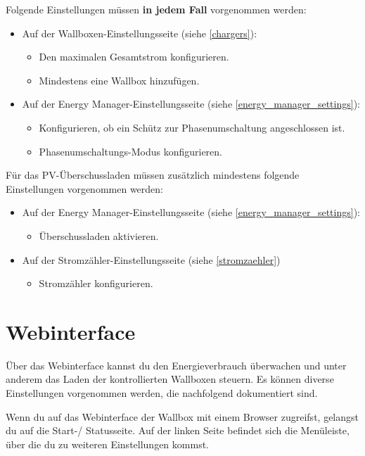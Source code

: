 \documentclass[a4paper,10pt]{article}
\begin{document}
\begin{multicols*}{2}
	Folgende Einstellungen müssen \textbf{in jedem Fall} vorgenommen werden:
	\begin{itemize}
	 \item Auf der Wallboxen-Einstellungsseite (siehe \ref{chargers}):
	 \begin{itemize}
		\item Den maximalen Gesamtstrom konfigurieren.
		\item Mindestens eine Wallbox hinzufügen.
	 \end{itemize}
	 \item Auf der Energy Manager-Einstellungsseite (siehe \ref{energy_manager_settings}):
	 \begin{itemize}
		\item Konfigurieren, ob ein Schütz zur Phasenumschaltung angeschlossen ist.
		\item Phasenumschaltungs-Modus konfigurieren.
	 \end{itemize}
	\end{itemize}

	Für das PV-Überschussladen müssen zusätzlich mindestens folgende Einstellungen vorgenommen werden:
	\begin{itemize}
	 \item Auf der Energy Manager-Einstellungsseite (siehe \ref{energy_manager_settings}):
	 \begin{itemize}
		\item Überschussladen aktivieren.
	 \end{itemize}
	 \item Auf der Stromzähler-Einstellungsseite (siehe \ref{stromzaehler})
	 \begin{itemize}
		\item Stromzähler konfigurieren.
	 \end{itemize}
	\end{itemize}

	\newpage
	\section{Webinterface}
	\label{webinterface}
	\vspace{-0.2cm}

	Über das Webinterface kannst du den Energieverbrauch überwachen und
	unter anderem das Laden der kontrollierten Wallboxen steuern.
	Es können diverse Einstellungen vorgenommen werden, die nachfolgend
	dokumentiert sind.

	Wenn du auf das Webinterface der Wallbox mit einem Browser zugreifst,
	gelangst du auf die Start-/ Statusseite. Auf der linken Seite befindet sich
	die Menüleiste, über die du zu weiteren Einstellungen kommst.


\end{multicols*}
\end{document}
